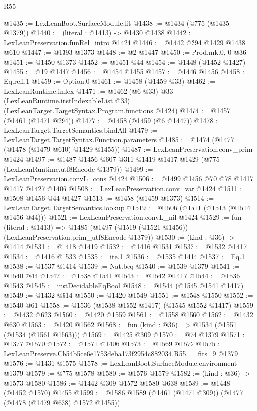 \begin{lexlean}{R55}
\begin{coremodule}
{{@1435 := LexLeanBoot.SurfaceModule.lit
@1438 := @1434 (@775 (@1435 @1379))
@1440 := (literal : @1413) -> @1430 @1438
@1442 := LexLeanPreservation.funRel_intro @1424
@1446 := @1442 @294 @1429 @1438 @610
@1447 := @1393 @1373
@1448 := @2 @1447
@1450 := Prod.mk.{0, 0} @36
@1451 := @1450 @1373
@1452 := @1451 @44
@1454 := @1448 (@1452 @1427)
@1455 := @19 @1447
@1456 := @1454 @1455
@1457 := @1446 @1456
@1458 := Eq.refl.{1}
@1459 := Option.{0}
@1461 := @1458 (@1459 @33)
@1462 := LexLeanRuntime.index
@1471 := @1462
    (@6 @33)
    @33
    (LexLeanRuntime.instIndexableList @33)
    (LexLeanTarget.TargetSyntax.Program.functions @1424)
@1474 := @1457 (@1461 (@1471 @294))
@1477 := @1458 (@1459 (@6 @1447))
@1478 := LexLeanTarget.TargetSemantics.bindAll
@1479 := LexLeanTarget.TargetSyntax.Function.parameters
@1485 := @1474 (@1477 (@1478 (@1479 @610) @1429 @1455))
@1487 := LexLeanPreservation.conv_prim @1424
@1497 := @1487 @1456 @607 @311 @1419 @1417 @1429 (@775 (LexLeanRuntime.utf8Encode @1379))
@1499 := LexLeanPreservation.convL_cons @1424
@1506 := @1499 @1456 @70 @78 @1417 @1417 @1427 @1406
@1508 := LexLeanPreservation.conv_var @1424
@1511 := @1508 @1456 @44 @1427
@1513 := @1458 (@1459 @1373)
@1514 := LexLeanTarget.TargetSemantics.lookup
@1519 := @1506 (@1511 (@1513 (@1514 @1456 @44)))
@1521 := LexLeanPreservation.convL_nil @1424
@1529 := fun (literal : @1413) =>
  @1485 (@1497 (@1519 (@1521 @1456)) (LexLeanPreservation.prim_utf8Encode @1379))
@1530 := (kind : @36) -> @1414
@1531 := @1418 @1419
@1532 := @1416 @1531
@1533 := @1532 @1417
@1534 := @1416 @1533
@1535 := ite.{1}
@1536 := @1535 @1414
@1537 := Eq.{1}
@1538 := @1537 @1414
@1539 := Nat.beq
@1540 := @1539 @1379
@1541 := @1540 @44
@1542 := @1538 @1541
@1543 := @1542 @1417
@1544 := @1536 @1543
@1545 := instDecidableEqBool
@1548 := @1544 (@1545 @1541 @1417)
@1549 := @1432 @614
@1550 := @1420 @1549
@1551 := @1548 @1550
@1552 := @1540 @61
@1558 := @1536 (@1538 @1552 @1417) (@1545 @1552 @1417)
@1559 := @1432 @623
@1560 := @1420 @1559
@1561 := @1558 @1560
@1562 := @1432 @630
@1563 := @1420 @1562
@1568 := fun (kind : @36) => @1534 (@1551 (@1534 (@1561 @1563)))
@1569 := @1425 @309
@1570 := @74 @1379
@1571 := @1377 @1570
@1572 := @1571 @1406
@1573 := @1569 @1572
@1575 := LexLeanPreserve.Cb54b5ce6e1753deba173f2954c882034.R55.__fits_9 @1379
@1576 := @1431 @1575
@1578 := LexLeanBoot.SurfaceModule.environment @1379
@1579 := @775 @1578
@1580 := @1576 @1579
@1582 := (kind : @36) -> @1573 @1580
@1586 := @1442 @309 @1572 @1580 @638
@1589 := @1448 (@1452 @1570) @1455
@1599 := @1586 @1589 (@1461 (@1471 @309)) (@1477 (@1478 (@1479 @638) @1572 @1455))
}}
\end{coremodule}
\end{lexlean}
